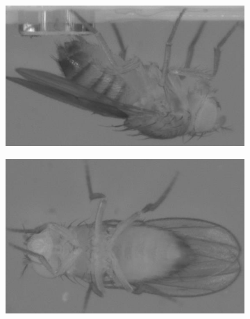 \begin{figure}[ht!]
	\centering
	\begin{subfigure}[b]{0.265\linewidth}
		\centering\includegraphics[width=\linewidth]{figures/FlyOrientation-ParallelHorizontal.png}
		\caption{\label{figure:parallel-horizontal-orientation}}
	\end{subfigure}%
	\hfill
	\begin{subfigure}[b]{0.24\linewidth}
		\centering\includegraphics[width=\linewidth]{figures/FlyOrientation-Oblique.png}
		\caption{\label{figure:oblique-orientation}}
	\end{subfigure}%
	\hfill
	\begin{subfigure}[b]{0.24\linewidth}

\end{subfigure}
\end{figure}
